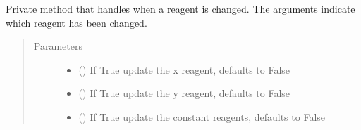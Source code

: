 \documentclass[letterpaper,10pt,english]{sphinxmanual}
\begin{document}
\begin{fulllineitems}
\begin{fulllineitems}
\begin{quote}
\begin{description}
\end{description}\end{quote}

\end{fulllineitems}


\begin{fulllineitems}
\label{\detokenize{polo.widgets:polo.widgets.optimize_widget.OptimizeWidget._handle_reagent_change}}
Private method that handles when a reagent is changed. The arguments
indicate which reagent has been changed.
\begin{quote}\begin{description}
\item[{Parameters}] \leavevmode\begin{itemize}
\item {} 
 (\sphinxstyleliteralemphasis{\sphinxupquote{, }}) \textendash{} If True update the x reagent, defaults to False

\item {} 
 (\sphinxstyleliteralemphasis{\sphinxupquote{, }}) \textendash{} If True update the y reagent, defaults to False

\item {} 
 (\sphinxstyleliteralemphasis{\sphinxupquote{, }}) \textendash{} If True update the constant reagents, defaults to False

\end{itemize}

\end{description}\end{quote}

\end{fulllineitems}


\end{fulllineitems}
\end{document}
